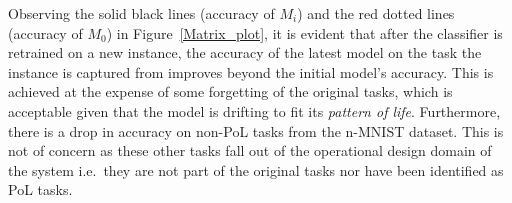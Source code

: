 Observing the solid black lines (accuracy of $M_i$) and the red dotted lines (accuracy of $M_0$) in Figure~\ref{Matrix_plot}, it is evident that after the classifier is retrained on a new instance, the accuracy of the latest model on the task the instance is captured from
%
%
improves beyond the initial model's accuracy.
% 
This is achieved at the expense of some forgetting of the original tasks, which is acceptable given that the model is drifting to fit its \textit{pattern of life}.    
%
Furthermore, there is a drop in accuracy on non-PoL tasks from the n-MNIST dataset. %
%
This is not of concern as these other tasks fall out of the operational design domain of the system i.e.\ they are not part of the original tasks nor have been identified as PoL tasks.

%
%

